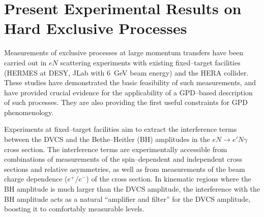 \section{Present Experimental Results on Hard Exclusive Processes}

Measurements of exclusive processes at large momentum transfers 
have been carried out in $eN$ scattering experiments with existing 
fixed--target facilities (HERMES at DESY, JLab with 6~GeV beam 
energy) and the HERA collider. These studies have demonstrated the basic 
feasibility of such measurements, and have provided crucial evidence for 
the applicability of a GPD--based description of such processes.
They are also providing the first useful constraints for GPD phenomenology.

Experiments at fixed--target facilities aim to extract the
interference terms between the DVCS and the Bethe--Heitler (BH) amplitudes
in the $eN \to e'N\gamma$ cross section. The interference terms are 
experimentally accessible from combinations of measurements of the
spin--dependent and independent cross sections and relative asymmetries,
as well as from measurements of the beam charge dependence ($e^+ / e^-$)
of the cross section. In kinematic regions where the BH amplitude is much 
larger than the DVCS amplitude, the interference with the BH amplitude acts 
as a natural ``amplifier and filter'' for the DVCS amplitude, boosting
it to comfortably measurable levels. 

